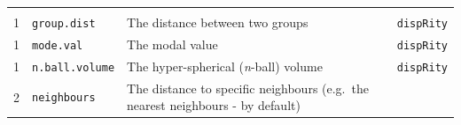 \documentclass[
]{book}
\begin{document}
\begin{longtable}[]{@{}llll@{}}
\begin{minipage}[t]{0.10\columnwidth}
\end{minipage}\tabularnewline
\begin{minipage}[t]{0.07\columnwidth}\raggedright
1\strut
\end{minipage} & \begin{minipage}[t]{0.07\columnwidth}\raggedright
\texttt{group.dist}\strut
\end{minipage} & \begin{minipage}[t]{0.64\columnwidth}\raggedright
The distance between two groups\strut
\end{minipage} & \begin{minipage}[t]{0.10\columnwidth}\raggedright
\texttt{dispRity}\strut
\end{minipage}\tabularnewline
\begin{minipage}[t]{0.07\columnwidth}\raggedright
1\strut
\end{minipage} & \begin{minipage}[t]{0.07\columnwidth}\raggedright
\texttt{mode.val}\strut
\end{minipage} & \begin{minipage}[t]{0.64\columnwidth}\raggedright
The modal value\strut
\end{minipage} & \begin{minipage}[t]{0.10\columnwidth}\raggedright
\texttt{dispRity}\strut
\end{minipage}\tabularnewline
\begin{minipage}[t]{0.07\columnwidth}\raggedright
1\strut
\end{minipage} & \begin{minipage}[t]{0.07\columnwidth}\raggedright
\texttt{n.ball.volume}\strut
\end{minipage} & \begin{minipage}[t]{0.64\columnwidth}\raggedright
The hyper-spherical (\emph{n}-ball) volume\strut
\end{minipage} & \begin{minipage}[t]{0.10\columnwidth}\raggedright
\texttt{dispRity}\strut
\end{minipage}\tabularnewline
\begin{minipage}[t]{0.07\columnwidth}\raggedright
2\strut
\end{minipage} & \begin{minipage}[t]{0.07\columnwidth}\raggedright
\texttt{neighbours}\strut
\end{minipage} & \begin{minipage}[t]{0.64\columnwidth}\raggedright
The distance to specific neighbours (e.g.~the nearest neighbours - by default)\strut

\end{minipage}
\end{longtable}
\end{document}
